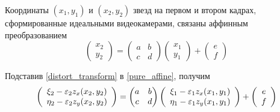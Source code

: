 Координаты $(x_1, y_1)$ и $(x_2, y_2)$ звезд на первом и втором кадрах, сформированные идеальными видеокамерами, связаны аффинным преобразованием
\begin{equation} \label{pure_affine}
    \left( \begin{array}{c} x_2 \\ y_2 \end{array} \right) =
    \begin{pmatrix} a & b \\ c & d \end{pmatrix}
    \left( \begin{array}{c} x_1 \\ y_1 \end{array} \right) +
    \left( \begin{array}{c} e \\ f \end{array} \right)
\end{equation}

Подставив \eqref{distort_transform} в \eqref{pure_affine}, получим
\begin{equation*}
    \left( \begin{array}{c} \xi_2 - \varepsilon_2 z_x(x_2, y_2) \\
    \eta_2 - \varepsilon_2 z_y(x_2, y_2) \end{array} \right) =
    \begin{pmatrix} a & b \\ c & d \end{pmatrix}
    \left( \begin{array}{c} \xi_1 - \varepsilon_1 z_x(x_1, y_1) \\
    \eta_1 - \varepsilon_1 z_y(x_1, y_1) \end{array} \right) +
    \left( \begin{array}{c} e \\ f \end{array} \right)
\end{equation*}

